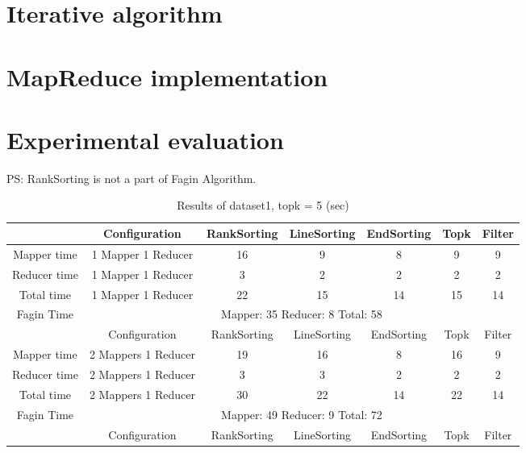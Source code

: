 \documentclass[a4paper]{article}
\begin{document}
\section{Iterative algorithm}
\label{sec:iterative}

\section{MapReduce implementation}
\label{sec:mapreduce}

\section{Experimental evaluation}
\label{sec:experiments}

PS: RankSorting is not a part of Fagin Algorithm.

\begin{table}[htbp]
    \caption{Results of dataset1, topk = 5 (sec)}
    \begin{center}
        \begin{tabular}{|c|c|c|c|c|c|c|}
            \hline
             & Configuration & RankSorting & LineSorting & EndSorting & Topk & Filter  \\
            \hline
            Mapper time & 1 Mapper 1 Reducer & 16 & 9 & 8 & 9 & 9  \\
            Reducer time & 1 Mapper 1 Reducer & 3 & 2 & 2 & 2 & 2   \\
            Total time & 1 Mapper 1 Reducer & 22 & 15 & 14 & 15 & 14 \\
            \hline
            Fagin Time & \multicolumn{6}{|c|}{Mapper: 35 Reducer: 8 Total: 58}  \\
            \hline
            \hline
             & Configuration & RankSorting & LineSorting & EndSorting & Topk & Filter  \\
            \hline
            Mapper time & 2 Mappers 1 Reducer & 19 & 16 & 8 & 16 & 9  \\
            Reducer time & 2 Mappers 1 Reducer & 3 & 3 & 2 & 2 & 2   \\
            Total time & 2 Mappers 1 Reducer & 30 & 22 & 14 & 22 & 14 \\
            \hline
            Fagin Time & \multicolumn{6}{|c|}{Mapper: 49 Reducer: 9 Total: 72}  \\
            \hline
            \hline
             & Configuration & RankSorting & LineSorting & EndSorting & Topk & Filter  \\
            \hline

\end{tabular}
\end{center}
\end{table}
\end{document}
